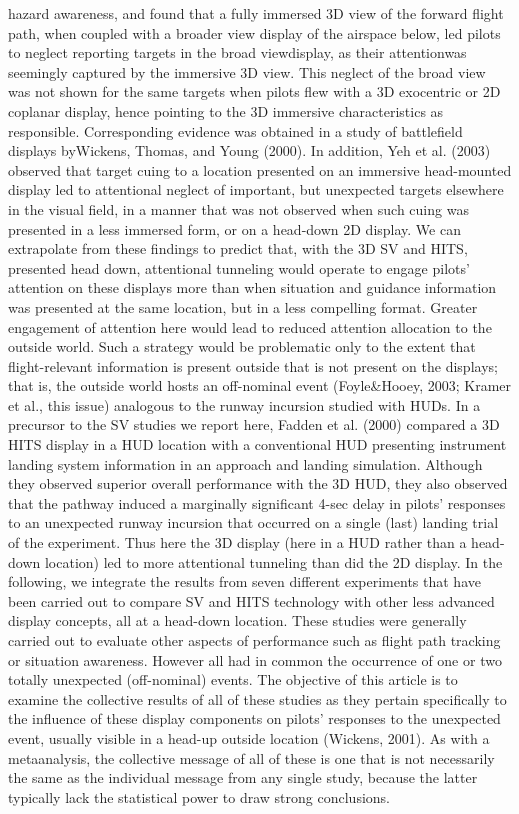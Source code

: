 \documentclass[utf8,bachelor,manualbib]{gradu3}
\begin{document}
hazard awareness, and found that a fully immersed 3D view of the forward flight
path, when coupled with a broader view display of the airspace below, led pilots to
neglect reporting targets in the broad viewdisplay, as their attentionwas seemingly
captured by the immersive 3D view. This neglect of the broad view was not shown
for the same targets when pilots flew with a 3D exocentric or 2D coplanar display,
hence pointing to the 3D immersive characteristics as responsible. Corresponding
evidence was obtained in a study of battlefield displays byWickens, Thomas, and
Young (2000). In addition, Yeh et al. (2003) observed that target cuing to a location
presented on an immersive head-mounted display led to attentional neglect of important,
but unexpected targets elsewhere in the visual field, in a manner that was
not observed when such cuing was presented in a less immersed form, or on a
head-down 2D display.
We can extrapolate from these findings to predict that, with the 3D SV and
HITS, presented head down, attentional tunneling would operate to engage pilots’
attention on these displays more than when situation and guidance information was presented at the same location, but in a less compelling format. Greater engagement
of attention here would lead to reduced attention allocation to the outside
world. Such a strategy would be problematic only to the extent that flight-relevant
information is present outside that is not present on the displays; that is, the
outside world hosts an off-nominal event (Foyle\&Hooey, 2003; Kramer et al., this
issue) analogous to the runway incursion studied with HUDs.
In a precursor to the SV studies we report here, Fadden et al. (2000) compared a
3D HITS display in a HUD location with a conventional HUD presenting instrument
landing system information in an approach and landing simulation. Although
they observed superior overall performance with the 3D HUD, they also observed
that the pathway induced a marginally significant 4-sec delay in pilots’ responses
to an unexpected runway incursion that occurred on a single (last) landing trial of
the experiment. Thus here the 3D display (here in a HUD rather than a head-down
location) led to more attentional tunneling than did the 2D display.
In the following, we integrate the results from seven different experiments that
have been carried out to compare SV and HITS technology with other less advanced
display concepts, all at a head-down location. These studies were generally
carried out to evaluate other aspects of performance such as flight path tracking or
situation awareness. However all had in common the occurrence of one or two totally
unexpected (off-nominal) events. The objective of this article is to examine
the collective results of all of these studies as they pertain specifically to the influence
of these display components on pilots’ responses to the unexpected event,
usually visible in a head-up outside location (Wickens, 2001). As with a metaanalysis,
the collective message of all of these is one that is not necessarily the
same as the individual message from any single study, because the latter typically
lack the statistical power to draw strong conclusions. \citep{wickens2009}
\end{document}
